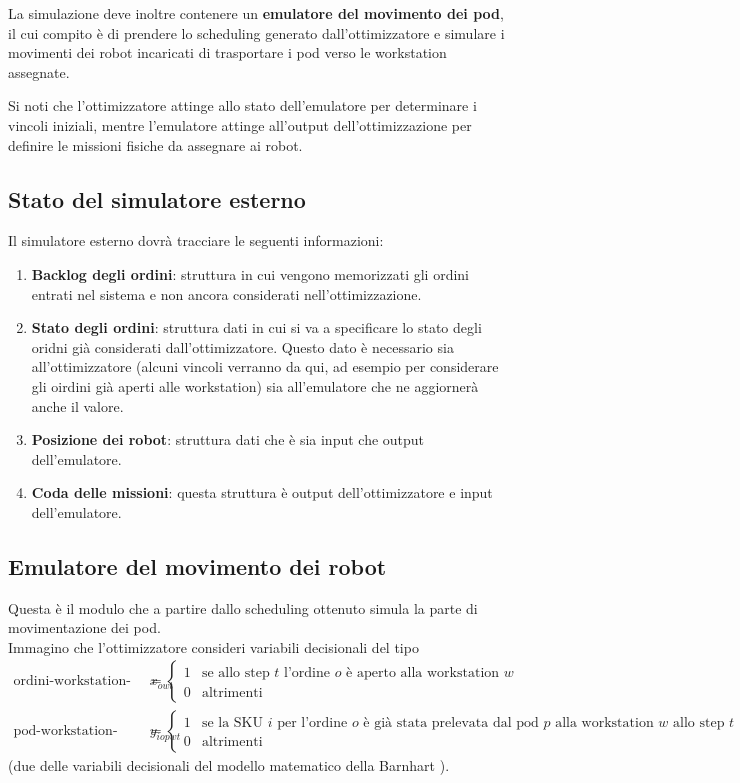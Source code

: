 \documentclass{article}
\begin{document}
La simulazione deve inoltre contenere un \textbf{emulatore del movimento dei pod}, il cui compito è di prendere lo scheduling generato dall'ottimizzatore e simulare i movimenti dei robot incaricati di trasportare i pod verso le workstation assegnate. 

Si noti che l'ottimizzatore attinge allo stato dell'emulatore per determinare i vincoli iniziali, mentre l'emulatore attinge all'output dell'ottimizzazione per definire le missioni fisiche da assegnare ai robot.

\subsection{Stato del simulatore esterno}
Il simulatore esterno dovrà tracciare le seguenti informazioni:
\begin{enumerate}
    \item \textbf{Backlog degli ordini}: struttura in cui vengono memorizzati gli ordini entrati nel sistema e non ancora considerati nell'ottimizzazione.
    \item \textbf{Stato degli ordini}: struttura dati in cui si va a specificare lo stato degli oridni già considerati dall'ottimizzatore. Questo dato è necessario sia all'ottimizzatore (alcuni vincoli verranno da qui, ad esempio per considerare gli oirdini già aperti alle workstation) sia all'emulatore che ne aggiornerà anche il valore.
    \item \textbf{Posizione dei robot}: struttura dati che è sia input che output dell'emulatore.
    \item \textbf{Coda delle missioni}: questa struttura è output dell'ottimizzatore e input dell'emulatore.
\end{enumerate}






\subsection{Emulatore del movimento dei robot}
Questa è il modulo che a partire dallo scheduling ottenuto simula la parte di movimentazione dei pod. \\
Immagino che l'ottimizzatore consideri variabili decisionali del tipo
\[
\begin{aligned}
\text{ordini-workstation-tempo} \quad 
x_{owt} &=
\begin{cases}
1 & \text{se allo step $t$ l'ordine $o$ è aperto alla workstation $w$} \\
0 & \text{altrimenti}
\end{cases} \\[1em]
\text{pod-workstation-tempo} \quad 
y_{iopwt} &=
\begin{cases}
1 & \text{se la SKU $i$ per l'ordine $o$ è già stata prelevata dal pod $p$ alla workstation $w$ allo step $t$} \\
0 & \text{altrimenti}
\end{cases}
\end{aligned}
\]
(due delle variabili decisionali del modello matematico della Barnhart \cite{Barnhart2024}).
\end{document}
